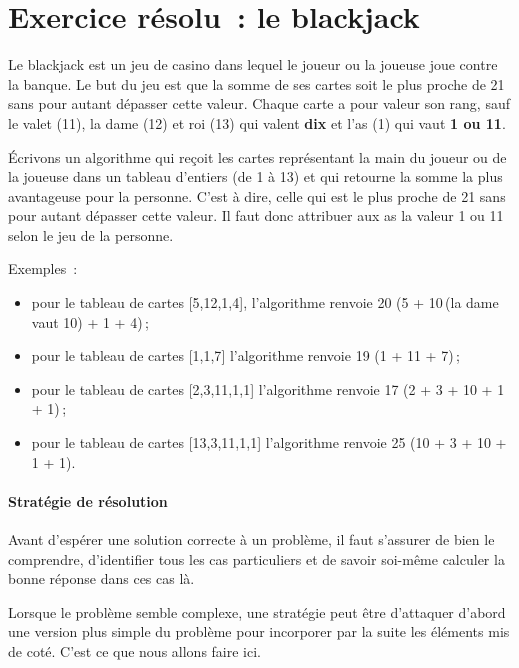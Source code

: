 \clearpage
\section{Exercice résolu~: le blackjack}
\label{exercice-resolu-blackjack}

Le blackjack est un jeu de casino dans lequel le joueur ou la joueuse joue
contre la banque. Le but du jeu est que la somme de ses cartes soit le
plus proche de 21 sans pour autant dépasser cette valeur. Chaque carte a
pour valeur son rang, sauf le valet (11), la dame (12) et roi (13) qui
valent \textbf{dix} et l'as (1) qui vaut \textbf{1 ou 11}.

Écrivons un algorithme qui reçoit les cartes représentant la main du joueur ou de
la joueuse dans un tableau d'entiers (de 1 à 13) et qui retourne la somme la
plus avantageuse pour la personne. C'est à dire, celle qui est le plus proche
de 21 sans pour autant dépasser cette valeur. Il faut donc attribuer aux as la
valeur 1 ou 11 selon le jeu de la personne.

Exemples~:

\begin{itemize}

	\item pour le tableau de cartes {[}5,12,1,4{]}, l'algorithme renvoie 20
		(5 + 10\,(la dame vaut 10) + 1 + 4)\,;

	\item pour le tableau de cartes {[}1,1,7{]} l'algorithme renvoie 19
		(1 + 11 + 7)\,;

	\item pour le tableau de cartes {[}2,3,11,1,1{]} l'algorithme renvoie 17 (2
		+ 3 + 10 + 1 + 1)\,;

	\item pour le tableau de cartes {[}13,3,11,1,1{]} l'algorithme renvoie 25
		(10 + 3 + 10 + 1 + 1).

\end{itemize}

\paragraph{Stratégie de résolution}

Avant d'espérer une solution correcte à un problème, il faut s'assurer
de bien le comprendre, d'identifier tous les cas particuliers et de
savoir soi-même calculer la bonne réponse dans ces cas là.

Lorsque le problème semble complexe, une stratégie peut être d'attaquer
d'abord une version plus simple du problème pour incorporer par la suite
les éléments mis de coté. C'est ce que nous allons faire ici.



